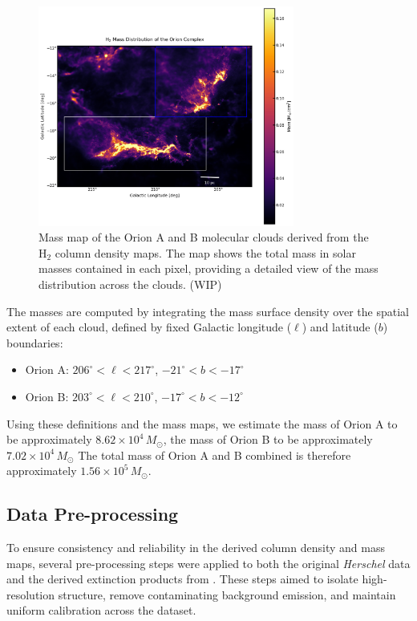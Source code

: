 \begin{figure}[t]
    \centering
    \includegraphics[width=0.75\textwidth]{figures/mass_distribution.png}
    \caption{Mass map of the Orion A and B molecular clouds derived from the H$_2$ column density maps. The map shows the total mass in solar masses contained in each pixel, providing a detailed view of the mass distribution across the clouds. (WIP)}
    \label{fig:mass_map}
\end{figure}

The masses are computed by integrating the mass surface density over the spatial extent of each cloud, defined by fixed Galactic longitude ($\ell$) and latitude ($b$) boundaries:

\begin{itemize}
    \item Orion A: $206^\circ < \ell < 217^\circ$, $-21^\circ < b < -17^\circ$
    \item Orion B: $203^\circ < \ell < 210^\circ$, $-17^\circ < b < -12^\circ$
\end{itemize}

Using these definitions and the mass maps, we estimate the mass of Orion A to be approximately $8.62 \times 10^4 \, M_\odot$, the mass of Orion B to be approximately $7.02 \times 10^4 \, M_\odot$
The total mass of Orion A and B combined is therefore approximately $1.56 \times 10^5 \, M_\odot$.

\subsection{Data Pre-processing}

To ensure consistency and reliability in the derived column density and mass maps, several pre-processing steps were applied to both the original \textit{Herschel} data and the derived extinction products from \cite{lombardi2014orion}. These steps aimed to isolate high-resolution structure, remove contaminating background emission, and maintain uniform calibration across the dataset.

